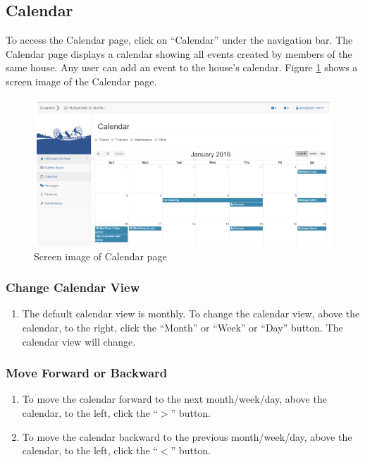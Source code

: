 \documentclass[12pt]{article}
\begin{document}
    \subsection{Calendar}
    To access the Calendar page, click on ``Calendar'' under the navigation bar. The Calendar page displays a calendar showing all events created by members of the same house. Any user can add an event to the house's calendar. Figure \ref{fig:calendar} shows a screen image of the Calendar page.

    \begin{figure}
        \centering
        \includegraphics[width=\textwidth]{calendar}
        \caption{Screen image of Calendar page}
        \label{fig:calendar}
    \end{figure}

    \subsubsection{Change Calendar View}
    \begin{enumerate}
        \item The default calendar view is monthly. To change the calendar view, above the calendar, to the right, click the ``Month'' or ``Week'' or ``Day'' button. The calendar view will change.
    \end{enumerate}

    \subsubsection{Move Forward or Backward}
    \begin{enumerate}
        \item To move the calendar forward to the next month/week/day,  above the calendar, to the left, click the ``$>$'' button.
        \item To move the calendar backward to the previous month/week/day,  above the calendar, to the left, click the ``$<$'' button.
    \end{enumerate}
\end{document}
